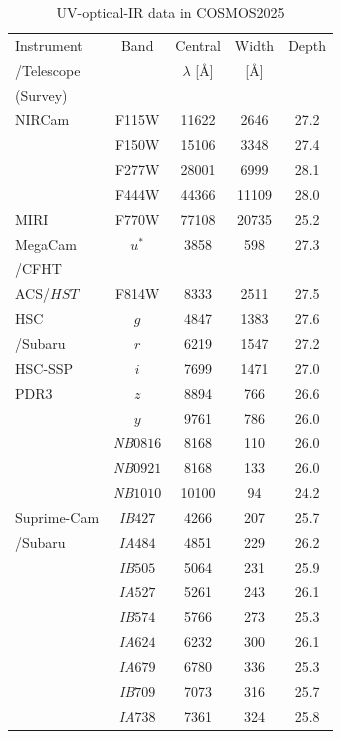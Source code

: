 \documentclass[longauth]{aa}
\begin{document}
\begin{table}[t!]
\centering
\caption{UV-optical-IR data in COSMOS2025}
\setlength{\tabcolsep}{8pt}
\begin{threeparttable}
\begin{tabular}{lcccc}
 \hline \hline
Instrument & Band & Central\tnote{a} & Width\tnote{b} & Depth\tnote{c} \\
/Telescope &  & $\lambda$ [\AA{}] & [\AA{}] &  \\
(Survey) &  &  &  &  \\
 \hline
 NIRCam & F115W & 11622 & 2646 & 27.2  \\
 & F150W & 15106 & 3348 & 27.4  \\
 & F277W & 28001 & 6999 & 28.1  \\
 & F444W & 44366 & 11109 & 28.0 \\
 \hline
 MIRI & F770W & 77108 & 20735 & 25.2  \\
 \hline
MegaCam & $u^{*}$ & 3858 & 598 & 27.3  \\
/CFHT  \\
 \hline
ACS/$HST$ & F814W & 8333 & 2511 & 27.5 \\
 \hline
HSC & $g$ & 4847 & 1383 & 27.6 \\
/Subaru & $r$ & 6219 & 1547 & 27.2  \\
HSC-SSP & $i$ & 7699 & 1471 & 27.0  \\
PDR3 & $z$ & 8894 & 766 & 26.6 \\
 & $y$ & 9761 & 786 & 26.0  \\
 & \textit{NB}$0816$ & 8168 & 110 & 26.0  \\
 & \textit{NB}$0921$ & 8168 & 133 & 26.0  \\
 & \textit{NB}$1010$ & 10100 & 94 & 24.2  \\
 \hline
Suprime-Cam & \textit{IB}$427$ & 4266 & 207 & 25.7  \\
/Subaru & \textit{IA}$484$ & 4851 & 229 & 26.2  \\
 & \textit{IB}$505$ & 5064 & 231 & 25.9  \\
 & \textit{IA}$527$ & 5261 & 243 & 26.1  \\
 & \textit{IB}$574$ & 5766 & 273 & 25.3  \\
 & \textit{IA}$624$ & 6232 & 300 & 26.1 \\
 & \textit{IA}$679$ & 6780 & 336 & 25.3  \\
 & \textit{IB}$709$ & 7073 & 316 & 25.7  \\
 & \textit{IA}$738$ & 7361 & 324 & 25.8  \\

\end{tabular}
\end{threeparttable}
\end{table}
\end{document}
